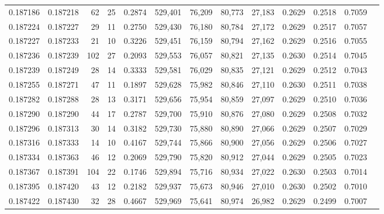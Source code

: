 \begin{tabular}{rrrrrrrrrrrrr}
0.187186 & 0.187218 &    62 &  25 &                                     0.2874 & 529,401 &  76,209 &  80,773 &  27,183 & 0.2629 & 0.2518 & 0.7059 \\
0.187224 & 0.187227 &    29 &  11 &                                     0.2750 & 529,430 &  76,180 &  80,784 &  27,172 & 0.2629 & 0.2517 & 0.7057 \\
0.187227 & 0.187233 &    21 &  10 &                                     0.3226 & 529,451 &  76,159 &  80,794 &  27,162 & 0.2629 & 0.2516 & 0.7055 \\
0.187236 & 0.187239 &   102 &  27 &                                     0.2093 & 529,553 &  76,057 &  80,821 &  27,135 & 0.2630 & 0.2514 & 0.7045 \\
0.187239 & 0.187249 &    28 &  14 &                                     0.3333 & 529,581 &  76,029 &  80,835 &  27,121 & 0.2629 & 0.2512 & 0.7043 \\
0.187255 & 0.187271 &    47 &  11 &                                     0.1897 & 529,628 &  75,982 &  80,846 &  27,110 & 0.2630 & 0.2511 & 0.7038 \\
0.187282 & 0.187288 &    28 &  13 &                                     0.3171 & 529,656 &  75,954 &  80,859 &  27,097 & 0.2629 & 0.2510 & 0.7036 \\
0.187290 & 0.187290 &    44 &  17 &                                     0.2787 & 529,700 &  75,910 &  80,876 &  27,080 & 0.2629 & 0.2508 & 0.7032 \\
0.187296 & 0.187313 &    30 &  14 &                                     0.3182 & 529,730 &  75,880 &  80,890 &  27,066 & 0.2629 & 0.2507 & 0.7029 \\
0.187316 & 0.187333 &    14 &  10 &                                     0.4167 & 529,744 &  75,866 &  80,900 &  27,056 & 0.2629 & 0.2506 & 0.7027 \\
0.187334 & 0.187363 &    46 &  12 &                                     0.2069 & 529,790 &  75,820 &  80,912 &  27,044 & 0.2629 & 0.2505 & 0.7023 \\
0.187367 & 0.187391 &   104 &  22 &                                     0.1746 & 529,894 &  75,716 &  80,934 &  27,022 & 0.2630 & 0.2503 & 0.7014 \\
0.187395 & 0.187420 &    43 &  12 &                                     0.2182 & 529,937 &  75,673 &  80,946 &  27,010 & 0.2630 & 0.2502 & 0.7010 \\
0.187422 & 0.187430 &    32 &  28 &                                     0.4667 & 529,969 &  75,641 &  80,974 &  26,982 & 0.2629 & 0.2499 & 0.7007 \\

\end{tabular}
